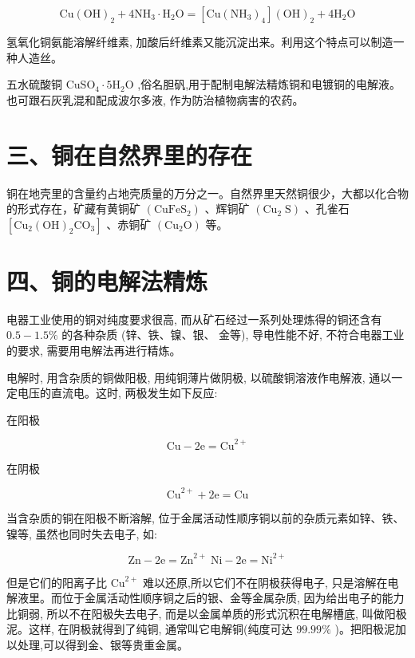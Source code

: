 \documentclass[10pt]{article}
\begin{document}
\[
\mathrm{{Cu}}{\left( \mathrm{{OH}}\right) }_{2} + 4{\mathrm{{NH}}}_{3} \cdot {\mathrm{H}}_{2}\mathrm{O} = \left\lbrack {\mathrm{{Cu}}{\left( {\mathrm{{NH}}}_{3}\right) }_{4}}\right\rbrack {\left( \mathrm{{OH}}\right) }_{2} + 4{\mathrm{H}}_{2}\mathrm{O}
\]

氢氧化铜氨能溶解纤维素, 加酸后纤维素又能沉淀出来。利用这个特点可以制造一种人造丝。

五水硫酸铜 \({\mathrm{{CuSO}}}_{4} \cdot 5{\mathrm{H}}_{2}\mathrm{O}\) ,俗名胆矾,用于配制电解法精炼铜和电镀铜的电解液。也可跟石灰乳混和配成波尔多液, 作为防治植物病害的农药。

\section*{三、铜在自然界里的存在}

铜在地壳里的含量约占地壳质量的万分之一。自然界里天然铜很少，大都以化合物的形式存在，矿藏有黄铜矿 \(\left( {\mathrm{{CuFeS}}}_{2}\right)\) 、辉铜矿 \(\left( {{\mathrm{{Cu}}}_{2}\mathrm{\;S}}\right)\) 、孔雀石 \(\left\lbrack {{\mathrm{{Cu}}}_{2}{\left( \mathrm{{OH}}\right) }_{2}{\mathrm{{CO}}}_{3}}\right\rbrack\) 、赤铜矿 \(\left( {{\mathrm{{Cu}}}_{2}\mathrm{O}}\right)\) 等。

\section*{四、铜的电解法精炼}

电器工业使用的铜对纯度要求很高, 而从矿石经过一系列处理炼得的铜还含有 \({0.5} - {1.5}\%\) 的各种杂质 (锌、铁、镍、银、 金等), 导电性能不好, 不符合电器工业的要求, 需要用电解法再进行精炼。

电解时, 用含杂质的铜做阳极, 用纯铜薄片做阴极, 以硫酸铜溶液作电解液, 通以一定电压的直流电。这时, 两极发生如下反应:

在阳极

\[
\mathrm{{Cu}} - 2\mathrm{e} = {\mathrm{{Cu}}}^{2 + }
\]

在阴极

\[
{\mathrm{{Cu}}}^{2 + } + 2\mathrm{e} = \mathrm{{Cu}}
\]

当含杂质的铜在阳极不断溶解, 位于金属活动性顺序铜以前的杂质元素如锌、铁、镍等, 虽然也同时失去电子, 如:

\[
\mathrm{{Zn}} - 2\mathrm{e} = {\mathrm{{Zn}}}^{2 + }\;\mathrm{{Ni}} - 2\mathrm{e} = {\mathrm{{Ni}}}^{2 + }
\]

但是它们的阳离子比 \({\mathrm{{Cu}}}^{2 + }\) 难以还原,所以它们不在阴极获得电子, 只是溶解在电解液里。而位于金属活动性顺序铜之后的银、金等金属杂质, 因为给出电子的能力比铜弱, 所以不在阳极失去电子, 而是以金属单质的形式沉积在电解槽底, 叫做阳极泥。这样, 在阴极就得到了纯铜, 通常叫它电解铜(纯度可达 \({99.99}\%\) )。把阳极泥加以处理,可以得到金、银等贵重金属。
\end{document}
